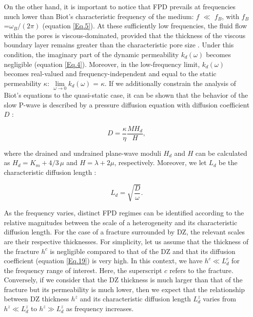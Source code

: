 \documentclass[draft]{agujournal2019}
\begin{document}
On the other hand, it is important to notice that FPD prevails at frequencies much lower than Biot's characteristic frequency of the medium: $f$ $\ll$ $f_B$, with $f_B$ =$\omega_B/(2 \pi)$ (equation \ref{Eq.5}). At these sufficiently low frequencies, the fluid flow within the pores is viscous-dominated,  provided that the thickness of the viscous boundary layer remains greater than the characteristic pore size \cite{Johnson1987}. Under this condition, the  imaginary part of the dynamic permeability $k_d (\omega)$ becomes negligible (equation \ref{Eq.4}).
Moreover, in the low-frequency limit, $k_d (\omega)$  becomes real-valued and frequ\-ency\--independent and equal to the static permeability $\kappa$: $ \lim \limits_{\omega \to 0}k_d (\omega)$ = $\kappa$. If we additionally constrain the analysis of Biot's equations to the quasi-static case, it can be shown that the behavior of the slow P-wave is described by a pressure diffusion equation with diffusion coefficient $D$ \cite{Chandler1981}: 
\begin{linenomath*}
\begin{equation}\label{Eq.19}
D = \frac{\kappa}{\eta} \frac{M H_d}{H},
\end{equation}
\end{linenomath*}
where the drained and undrained plane-wave moduli $H_d$ and $H$ can be calculated as $H_d= K_m + 4/3 \,\mu$ and $H = \lambda + 2 \mu$, respectively. Moreover, we let  $L_d$ be the characteristic diffusion length \cite{Norris1993}: 
\begin{linenomath*}
\begin{equation}\label{Eq.20}
L_d = \sqrt{\frac{D}{\omega}}.
\end{equation}
\end{linenomath*}
As the frequency varies, distinct FPD regimes can be identified according to the relative magnitudes between the scale of a heterogeneity and its characteristic diffusion length. For the case of a fracture surrounded by DZ, the relevant scales are their respective thicknesses. For simplicity, let us assume that the thickness of the fracture $h^c$ is negligible compared to that of the DZ and that its diffusion coefficient (equation \eqref{Eq.19}) is very high.
In this context, we have $h^c \ll L_d^c$ for the frequency range of interest. Here, the superscript $c$ refers to the fracture. Conversely, if we consider that the DZ thickness is much larger than that of the fracture but its permeability is much lower, then we expect that the relationship between DZ thickness $h^z$ and its characteristic diffusion length $L_d^z$  varies from $h^z\ll L_d^z$  to $h^z\gg L_d^z$ as frequency increases.
\end{document}

